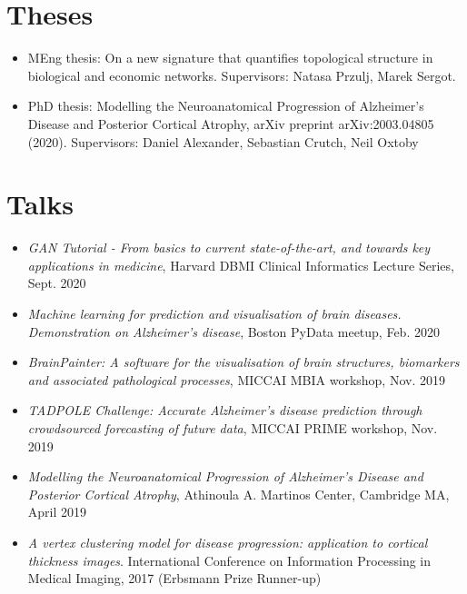 \documentclass[a4paper,10pt]{article} %
\begin{document}
\section*{Theses}
\begin{itemize}
 \item MEng thesis: On a new signature that quantifies topological structure in biological and economic networks. Supervisors: Natasa Przulj, Marek Sergot.
 \item PhD thesis: Modelling the Neuroanatomical Progression of Alzheimer's Disease and Posterior Cortical Atrophy, arXiv preprint arXiv:2003.04805 (2020). Supervisors: Daniel Alexander, Sebastian Crutch, Neil Oxtoby
\end{itemize}

\section*{Talks}
\begin{itemize}
 \item \emph{GAN Tutorial - From basics to current state-of-the-art, and towards key applications in medicine}, Harvard DBMI Clinical Informatics Lecture Series, Sept. 2020
 \item \emph{Machine learning for prediction and visualisation of brain diseases. Demonstration on Alzheimer's disease}, Boston PyData meetup, Feb. 2020
 \item \emph{BrainPainter: A software for the visualisation of brain structures, biomarkers and associated pathological processes}, MICCAI MBIA workshop, Nov. 2019
 \item \emph{TADPOLE Challenge: Accurate Alzheimer's disease prediction through crowdsourced forecasting of future data}, MICCAI PRIME workshop, Nov. 2019
 \item \emph{Modelling the Neuroanatomical Progression of Alzheimer's Disease and Posterior Cortical Atrophy}, Athinoula A. Martinos Center, Cambridge MA, April 2019
 \item \emph{A vertex clustering model for disease progression: application to cortical thickness images}. International Conference on Information Processing in Medical Imaging, 2017 (Erbsmann Prize Runner-up)
\end{itemize}
\end{document}
